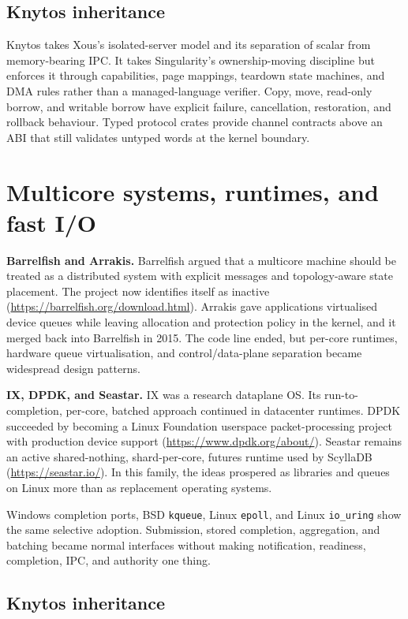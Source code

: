 \subsection{Knytos inheritance}

Knytos takes Xous's isolated-server model and its separation of scalar
from memory-bearing IPC. It takes Singularity's ownership-moving discipline
but enforces it through capabilities, page mappings, teardown state machines,
and DMA rules rather than a managed-language verifier. Copy, move, read-only
borrow, and writable borrow have explicit failure, cancellation, restoration,
and rollback behaviour. Typed protocol crates provide channel contracts above
an ABI that still validates untyped words at the kernel boundary.

\section{Multicore systems, runtimes, and fast I/O}

\textbf{Barrelfish and Arrakis.} Barrelfish argued that a multicore machine
should be treated as a distributed system with explicit messages and
topology-aware state placement. The project now identifies itself as inactive
(\url{https://barrelfish.org/download.html}). Arrakis gave applications
virtualised device queues while leaving allocation and protection policy in
the kernel, and it merged back into Barrelfish in 2015. The code line ended, but
per-core runtimes, hardware queue virtualisation, and control/data-plane
separation became widespread design patterns.

\textbf{IX, DPDK, and Seastar.} IX was a research dataplane OS. Its
run-to-completion, per-core, batched approach continued in datacenter runtimes.
DPDK succeeded by becoming a Linux Foundation userspace packet-processing
project with production device support (\url{https://www.dpdk.org/about/}).
Seastar remains an active shared-nothing, shard-per-core, futures runtime used
by ScyllaDB (\url{https://seastar.io/}). In this family, the ideas prospered as
libraries and queues on Linux more than as replacement operating systems.

Windows completion ports, BSD \texttt{kqueue}, Linux \texttt{epoll}, and
Linux \texttt{io\_uring} show the same selective adoption. Submission,
stored completion, aggregation, and batching became normal interfaces
without making notification, readiness, completion, IPC, and authority one
thing.

\subsection{Knytos inheritance}

